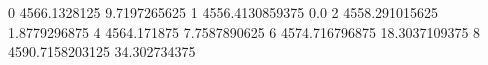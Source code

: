 0 4566.1328125 9.7197265625
1 4556.4130859375 0.0
2 4558.291015625 1.8779296875
4 4564.171875 7.7587890625
6 4574.716796875 18.3037109375
8 4590.7158203125 34.302734375
